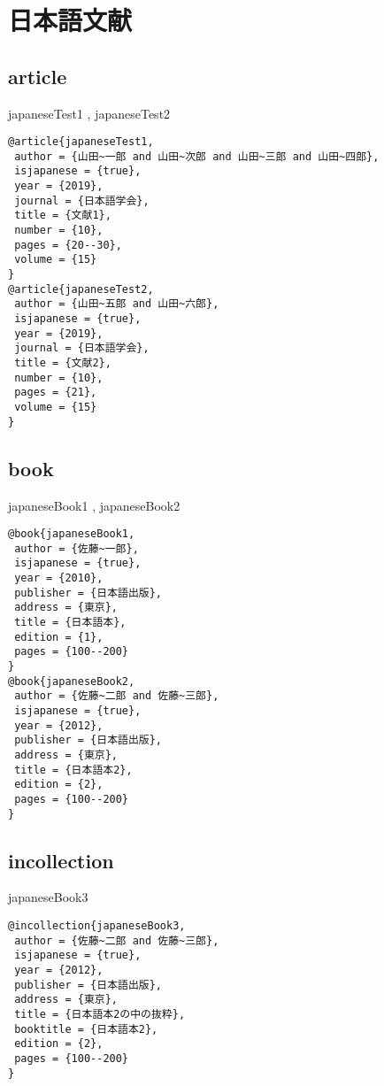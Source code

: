 \documentclass[10pt,a4paper]{article}
\author{JPandENbst}
\begin{document}
\section{日本語文献}
\subsection{article\\}
japaneseTest1 \cite{japaneseTest1}, 
japaneseTest2 \cite{japaneseTest2}

\begin{lstlisting}
@article{japaneseTest1,
 author = {山田~一郎 and 山田~次郎 and 山田~三郎 and 山田~四郎},
 isjapanese = {true},
 year = {2019},
 journal = {日本語学会},
 title = {文献1},
 number = {10},
 pages = {20--30},
 volume = {15}
}
@article{japaneseTest2,
 author = {山田~五郎 and 山田~六郎},
 isjapanese = {true},
 year = {2019},
 journal = {日本語学会},
 title = {文献2},
 number = {10},
 pages = {21},
 volume = {15}
}
\end{lstlisting}

\subsection{book\\}
japaneseBook1 \cite{japaneseBook1}, 
japaneseBook2 \cite{japaneseBook2}

\begin{lstlisting}
@book{japaneseBook1,
 author = {佐藤~一郎},
 isjapanese = {true},
 year = {2010},
 publisher = {日本語出版},
 address = {東京},
 title = {日本語本},
 edition = {1},
 pages = {100--200}
}
@book{japaneseBook2,
 author = {佐藤~二郎 and 佐藤~三郎},
 isjapanese = {true},
 year = {2012},
 publisher = {日本語出版},
 address = {東京},
 title = {日本語本2},
 edition = {2},
 pages = {100--200}
}
\end{lstlisting}

\subsection{incollection\\}
japaneseBook3 \cite{japaneseBook3}

\begin{lstlisting}
@incollection{japaneseBook3,
 author = {佐藤~二郎 and 佐藤~三郎},
 isjapanese = {true},
 year = {2012},
 publisher = {日本語出版},
 address = {東京},
 title = {日本語本2の中の抜粋},
 booktitle = {日本語本2},
 edition = {2},
 pages = {100--200}
}
\end{lstlisting}
\end{document}
